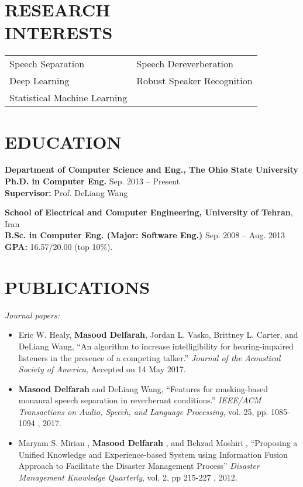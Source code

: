 \documentclass[margin, 10pt]{res}
\begin{document}
\begin{resume}

\section{RESEARCH\\INTERESTS}

\begin{tabular}{l l}
Speech Separation    & \hspace{0.3in}  Speech Dereverberation \\
Deep Learning    & \hspace{0.3in}   Robust Speaker Recognition \\
Statistical Machine Learning
\end{tabular}


\section{EDUCATION}

\textbf{Department of Computer Science and Eng., The Ohio State University }  \\
\textbf{Ph.D. in Computer Eng.} \hfill Sep. 2013 -- Present \\
\textbf{Supervisor:} Prof. DeLiang Wang

\textbf{School of Electrical and Computer Engineering, University of Tehran}, Iran\\
\textbf{B.Sc. in Computer Eng. (Major: Software Eng.)} \hfill Sep. 2008 -- Aug. 2013 \\
\textbf{GPA:} 16.57/20.00 (top 10\%).



\section{PUBLICATIONS}
\textit{Journal papers:}\\
\begin{itemize}
\item Eric W. Healy, \textbf{Masood Delfarah}, Jordan L. Vasko, Brittney L. Carter, and DeLiang Wang, ``An algorithm to increase intelligibility for hearing-impaired listeners in the presence of a competing talker.'' \textit{Journal of the Acoustical Society of America}, Accepted on 14 May 2017.
\item \textbf{Masood Delfarah} and DeLiang Wang, ``Features for masking-based monaural speech separation in reverberant conditions.'' \textit{IEEE/ACM Transactions on Audio, Speech, and Language Processing}, vol. 25, pp. 1085-1094 , 2017.
\item Maryam S. Mirian , \textbf{Masood Delfarah} , and Behzad Moshiri , ``Proposing a Unified Knowledge and Experience-based System using Information Fusion Approach to Facilitate the Disaster Management Process'' \textit{Disaster Management Knowledge Quarterly}, vol. 2, pp 215-227 , 2012. 
\end{itemize}


\end{resume}
\end{document}
